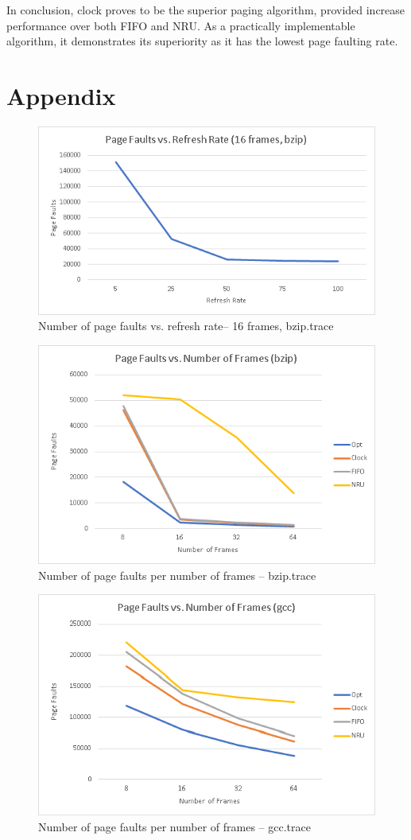 \documentclass[12pt, letterpaper]{report}
\begin{document}
In conclusion, clock proves to be the superior paging algorithm, provided increase performance over both FIFO and NRU. As a practically implementable algorithm, it demonstrates its superiority as it has the lowest page faulting rate.


\section{Appendix}

\begin{figure}[H]
	\centering
	\includegraphics[width=0.7\columnwidth]{pagefault_refreshrate_bzip.png}
	\caption{Number of page faults vs. refresh rate– 16 frames, bzip.trace}
\end{figure}

\begin{figure}[H]
	\centering
	\includegraphics[width=0.7\columnwidth]{pagefault_numframes_bzip.png}
	\caption{Number of page faults per number of frames – bzip.trace}
\end{figure}

\begin{figure}[H]
	\centering
	\includegraphics[width=0.7\columnwidth]{pagefault_numframes_gcc.png}
	\caption{Number of page faults per number of frames – gcc.trace}
\end{figure}
\end{document}
